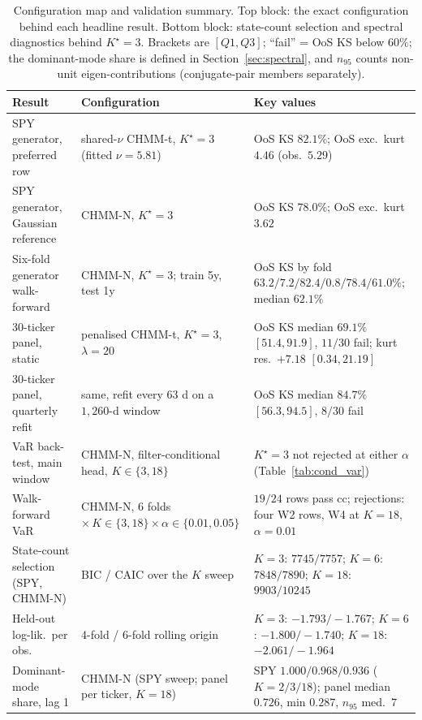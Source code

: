 \begin{table}[t]
\centering
\caption{Configuration map and validation summary. Top block: the exact configuration behind each headline result. Bottom block: state-count selection and spectral diagnostics behind $K^\star = 3$. Brackets are $[Q1, Q3]$; ``fail'' = OoS KS below $60\%$; the dominant-mode share is defined in Section~\ref{sec:spectral}, and $n_{95}$ counts non-unit eigen-contributions (conjugate-pair members separately).}
\label{tab:validation}
\footnotesize
\setlength{\tabcolsep}{3pt}
\begin{tabular}{l l l}
\toprule
Result & Configuration & Key values \\
\midrule
SPY generator, preferred row & shared-$\nu$ CHMM-t, $K^\star{=}3$ (fitted $\nu = 5.81$) & OoS KS $82.1\%$; OoS exc.\ kurt $4.46$ (obs.\ $5.29$) \\
SPY generator, Gaussian reference & CHMM-N, $K^\star{=}3$ & OoS KS $78.0\%$; OoS exc.\ kurt $3.62$ \\
Six-fold generator walk-forward & CHMM-N, $K^\star{=}3$; train 5y, test 1y & OoS KS by fold $63.2/7.2/82.4/0.8/78.4/61.0\%$; median $62.1\%$ \\
30-ticker panel, static & penalised CHMM-t, $K^\star{=}3$, $\lambda{=}20$ & OoS KS median $69.1\%$ $[51.4,91.9]$, $11/30$ fail; kurt res.\ $+7.18$ $[0.34,21.19]$ \\
30-ticker panel, quarterly refit & same, refit every $63$ d on a $1{,}260$-d window & OoS KS median $84.7\%$ $[56.3,94.5]$, $8/30$ fail \\
VaR back-test, main window & CHMM-N, filter-conditional head, $K \in \{3, 18\}$ & $K^\star{=}3$ not rejected at either $\alpha$ (Table~\ref{tab:cond_var}) \\
Walk-forward VaR & CHMM-N, $6$ folds $\times\, K \in \{3,18\} \times \alpha \in \{0.01,0.05\}$ & $19/24$ rows pass cc; rejections: four W2 rows, W4 at $K{=}18$, $\alpha{=}0.01$ \\
\midrule
State-count selection (SPY, CHMM-N) & BIC / CAIC over the $K$ sweep & $K{=}3$: $7745/7757$; $K{=}6$: $7848/7890$; $K{=}18$: $9903/10245$ \\
Held-out log-lik.\ per obs. & 4-fold / 6-fold rolling origin & $K{=}3$: $-1.793/{-}1.767$; $K{=}6$: $-1.800/{-}1.740$; $K{=}18$: $-2.061/{-}1.964$ \\
Dominant-mode share, lag 1 & CHMM-N (SPY sweep; panel per ticker, $K{=}18$) & SPY $1.000/0.968/0.936$ ($K{=}2/3/18$); panel median $0.726$, min $0.287$, $n_{95}$ med.\ $7$ \\
\bottomrule
\end{tabular}
\end{table}

